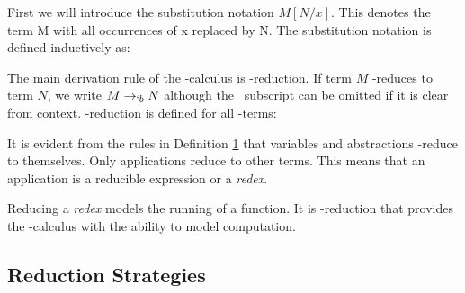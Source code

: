   First we will introduce the substitution notation $M[N/x]$. This denotes 
  the term M with all occurrences of x replaced by N. The substitution 
  notation is defined inductively as:
   
    \begin{figure}[!h]
    \end{figure}

  The main derivation rule of the \lam-calculus is \bta-reduction. If term
  $M$ \bta-reduces to term $N$, we write $M \rightarrow_{`b} N$ although 
  the \bta\ subscript can be omitted if it is clear from context. \bta-reduction
  is defined for all \lam-terms:
  \begin{figure}[!h]\label{def:beta-reduction}
  \end{figure}
  It is evident from the rules in Definition \ref{def:beta-reduction} that 
  variables and abstractions \bta-reduce to themselves. Only applications 
  reduce to other terms. This means that an application is a reducible 
  expression or a \emph{redex}. 
  
  Reducing a \emph{redex} models the running of a function. It is 
  \bta-reduction that provides the \lam-calculus with the ability to
  model computation. 

  \subsection{Reduction Strategies}

